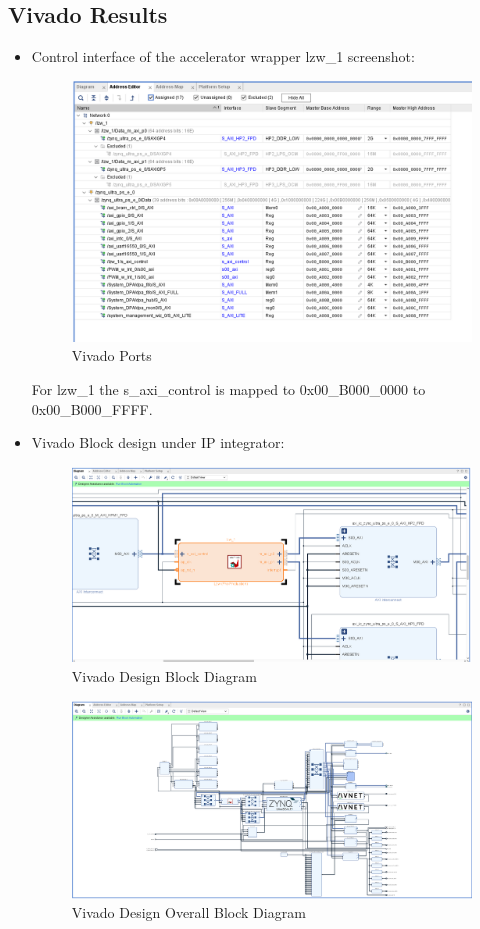 \documentclass[../main.tex]{subfiles}
\begin{document}
\subsection{Vivado Results}

\begin{itemize}
    \item Control interface of the accelerator wrapper lzw\_1 screenshot:
    \begin{figure}[H]
        \centering
        \includegraphics[width=0.7\linewidth]{Images/image8.png}
        \caption{Vivado Ports}
        \label{fig:vivado_ports}
    \end{figure}
    
    For lzw\_1 the s\_axi\_control is mapped to 0x00\_B000\_0000 to 0x00\_B000\_FFFF. \\

    \item Vivado Block design under IP integrator:
    \begin{figure}[H]
        \centering
        \includegraphics[width=0.8\linewidth]{Images/image12.png}
        \caption{Vivado Design Block Diagram}
        \label{fig:vivado_block}
    \end{figure}

    \begin{figure}[H]
        \centering
        \includegraphics[width=0.8\linewidth]{Images/image20.png}
        \caption{Vivado Design Overall Block Diagram}
        \label{fig:vivado_block_overall}
    \end{figure}


\end{itemize}
\end{document}
